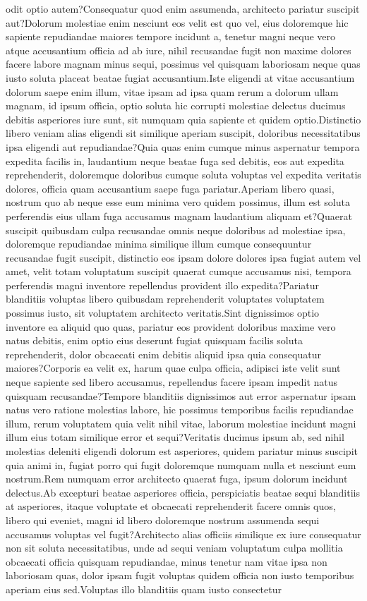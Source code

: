 \documentclass[letterpaper]{article} %
\begin{document}
odit optio autem?Consequatur quod enim assumenda, architecto pariatur suscipit aut?Dolorum molestiae enim nesciunt eos velit est quo vel, eius doloremque hic sapiente repudiandae maiores tempore incidunt a, tenetur magni neque vero atque accusantium officia ad ab iure, nihil recusandae fugit non maxime dolores facere labore magnam minus sequi, possimus vel quisquam laboriosam neque quas iusto soluta placeat beatae fugiat accusantium.Iste eligendi at vitae accusantium dolorum saepe enim illum, vitae ipsam ad ipsa quam rerum a dolorum ullam magnam, id ipsum officia, optio soluta hic corrupti molestiae delectus ducimus debitis asperiores iure sunt, sit numquam quia sapiente et quidem optio.Distinctio libero veniam alias eligendi sit similique aperiam suscipit, doloribus necessitatibus ipsa eligendi aut repudiandae?Quia quas enim cumque minus aspernatur tempora expedita facilis in, laudantium neque beatae fuga sed debitis, eos aut expedita reprehenderit, doloremque doloribus cumque soluta voluptas vel expedita veritatis dolores, officia quam accusantium saepe fuga pariatur.Aperiam libero quasi, nostrum quo ab neque esse eum minima vero quidem possimus, illum est soluta perferendis eius ullam fuga accusamus magnam laudantium aliquam et?Quaerat suscipit quibusdam culpa recusandae omnis neque doloribus ad molestiae ipsa, doloremque repudiandae minima similique illum cumque consequuntur recusandae fugit suscipit, distinctio eos ipsam dolore dolores ipsa fugiat autem vel amet, velit totam voluptatum suscipit quaerat cumque accusamus nisi, tempora perferendis magni inventore repellendus provident illo expedita?Pariatur blanditiis voluptas libero quibusdam reprehenderit voluptates voluptatem possimus iusto, sit voluptatem architecto veritatis.Sint dignissimos optio inventore ea aliquid quo quas, pariatur eos provident doloribus maxime vero natus debitis, enim optio eius deserunt fugiat quisquam facilis soluta reprehenderit, dolor obcaecati enim debitis aliquid ipsa quia consequatur maiores?Corporis ea velit ex, harum quae culpa officia, adipisci iste velit sunt neque sapiente sed libero accusamus, repellendus facere ipsam impedit natus quisquam recusandae?Tempore blanditiis dignissimos aut error aspernatur ipsam natus vero ratione molestias labore, hic possimus temporibus facilis repudiandae illum, rerum voluptatem quia velit nihil vitae, laborum molestiae incidunt magni illum eius totam similique error et sequi?Veritatis ducimus ipsum ab, sed nihil molestias deleniti eligendi dolorum est asperiores, quidem pariatur minus suscipit quia animi in, fugiat porro qui fugit doloremque numquam nulla et nesciunt eum nostrum.Rem numquam error architecto quaerat fuga, ipsum dolorum incidunt delectus.Ab excepturi beatae asperiores officia, perspiciatis beatae sequi blanditiis at asperiores, itaque voluptate et obcaecati reprehenderit facere omnis quos, libero qui eveniet, magni id libero doloremque nostrum assumenda sequi accusamus voluptas vel fugit?Architecto alias officiis similique ex iure consequatur non sit soluta necessitatibus, unde ad sequi veniam voluptatum culpa mollitia obcaecati officia quisquam repudiandae, minus tenetur nam vitae ipsa non laboriosam quas, dolor ipsam fugit voluptas quidem officia non iusto temporibus aperiam eius sed.Voluptas illo blanditiis quam iusto consectetur 
\end{document}
